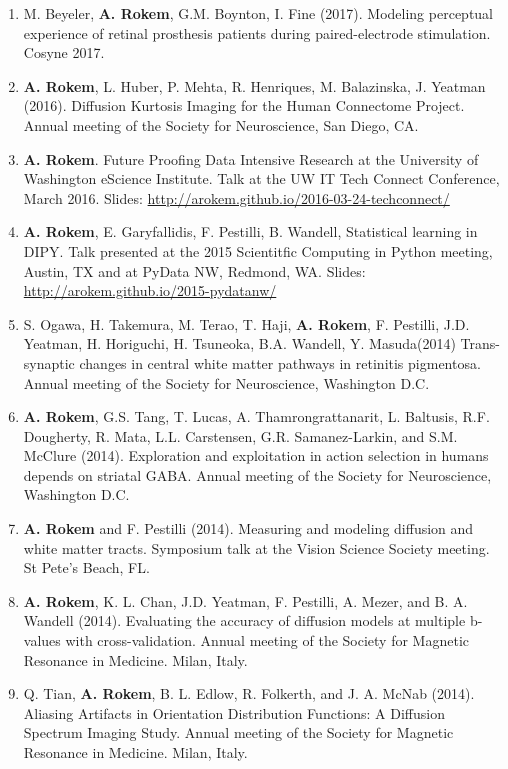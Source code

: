 \documentclass[11pt,fullpage]{article}
\begin{document}
\begin{enumerate}
\item M. Beyeler, {\bf A. Rokem}, G.M. Boynton, I. Fine (2017). Modeling
perceptual experience of retinal prosthesis patients during paired-electrode
stimulation. Cosyne 2017.

\item {\bf A. Rokem}, L. Huber, P. Mehta, R. Henriques, M. Balazinska, J. Yeatman (2016). Diffusion Kurtosis Imaging for the Human Connectome Project. Annual meeting of the Society for Neuroscience, San Diego, CA.

\item {\bf A. Rokem}. Future Proofing Data Intensive Research at the University of Washington eScience Institute. Talk at the UW IT Tech Connect Conference, March 2016. Slides: \url{http://arokem.github.io/2016-03-24-techconnect/}

\item {\bf A. Rokem}, E. Garyfallidis, F. Pestilli, B. Wandell, Statistical learning in DIPY. Talk presented at the 2015 Scientitfic Computing in Python meeting, Austin, TX and at PyData NW, Redmond, WA. Slides: \url{http://arokem.github.io/2015-pydatanw/}

\item S. Ogawa, H. Takemura, M. Terao, T. Haji, {\bf A. Rokem}, F. Pestilli, J.D. Yeatman, H. Horiguchi, H. Tsuneoka, B.A. Wandell, Y. Masuda(2014) Trans-synaptic changes in central white matter pathways in retinitis pigmentosa. Annual meeting of the Society for Neuroscience, Washington D.C.

\item {\bf A. Rokem}, G.S. Tang, T. Lucas, A. Thamrongrattanarit, L. Baltusis, R.F. Dougherty, R. Mata, L.L. Carstensen, G.R. Samanez-Larkin, and S.M. McClure (2014). Exploration and exploitation in action selection in humans depends on striatal GABA. Annual meeting of the Society for Neuroscience, Washington D.C.

\item {\bf A. Rokem} and F. Pestilli (2014). Measuring and modeling diffusion and white matter tracts. Symposium talk at the Vision Science Society meeting. St Pete's Beach, FL.

\item {\bf A. Rokem}, K. L. Chan, J.D. Yeatman, F. Pestilli, A. Mezer, and B. A. Wandell (2014). Evaluating the accuracy of diffusion models at multiple b-values with cross-validation. Annual meeting of the Society for Magnetic Resonance in Medicine. Milan, Italy.

\item Q. Tian, {\bf A. Rokem}, B. L. Edlow, R. Folkerth, and J. A. McNab (2014). Aliasing Artifacts in Orientation Distribution Functions: A Diffusion Spectrum Imaging Study. Annual meeting of the Society for Magnetic Resonance in Medicine. Milan, Italy.


\end{enumerate}
\end{document}
